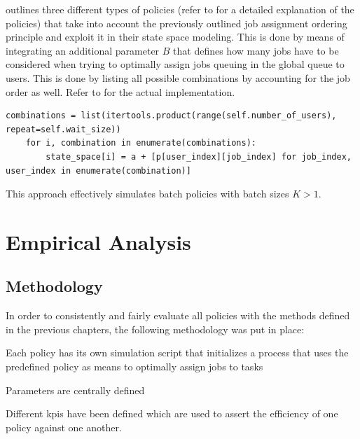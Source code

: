 \documentclass[draft=false]{seal_thesis}
\begin{document}
 outlines three different types of policies (refer to  for a detailed explanation of the policies) that take into account the previously outlined job assignment ordering principle and exploit it in their state space modeling. This is done by means of integrating an additional parameter $B$ that defines how many jobs have to be considered when trying to optimally assign jobs queuing in the global queue to users. This is done by listing all possible combinations by accounting for the job order as well. Refer to  for the actual implementation.

\begin{lstlisting}[caption=State space modeling by considering $B$ jobs from the global queue and integrating all possible combinations,label=lst:wz_combinations,style=CustomPython]
	combinations = list(itertools.product(range(self.number_of_users), repeat=self.wait_size))
    for i, combination in enumerate(combinations):
        state_space[i] = a + [p[user_index][job_index] for job_index, user_index in enumerate(combination)]
\end{lstlisting}

This approach effectively simulates batch policies with batch sizes $K>1$.

\glsresetall

\chapter{Empirical Analysis}
\label{ch:empirical_analysis}

\section{Methodology}

In order to consistently and fairly evaluate all policies with the methods defined in the previous chapters, the following methodology was put in place:
\begin{enumerate*}
	\item Each policy has its own simulation script that initializes a process that uses the predefined policy as means to optimally assign jobs to tasks
	\item Parameters are centrally defined
	\item Different \glspl{kpi} have been defined which are used to assert the efficiency of one policy against one another.
\end{enumerate*}
\end{document}
